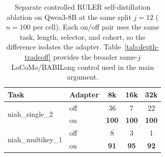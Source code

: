 \begin{table}[!t]
\centering
\small
\setlength{\tabcolsep}{4pt}
\begin{tabular}{@{}llccc@{}}
\toprule
\textbf{Task} & \textbf{Adapter} & \textbf{8k} & \textbf{16k} & \textbf{32k} \\
\midrule
\multirow{2}{*}{niah\_single\_2}
  & off & 36 & 7 & 22 \\
  & on  & \textbf{100} & \textbf{100} & \textbf{100} \\
\midrule
\multirow{2}{*}{niah\_multikey\_1}
  & off & 8 & 3 & 1 \\
  & on  & \textbf{91} & \textbf{95} & \textbf{92} \\
\bottomrule
\end{tabular}
\caption{Separate controlled RULER self-distillation ablation on Qwen3-8B at
the same split $j{=}12$ ($n{=}100$ per cell). Each on/off pair uses the same
task, length, selector, and cohort, so the difference isolates the adapter.
Table~\ref{tab:depth-tradeoff} provides the broader same-$j$ LoCoMo/BABILong
control used in the main argument.}
\label{tab:adapter}
\end{table}
